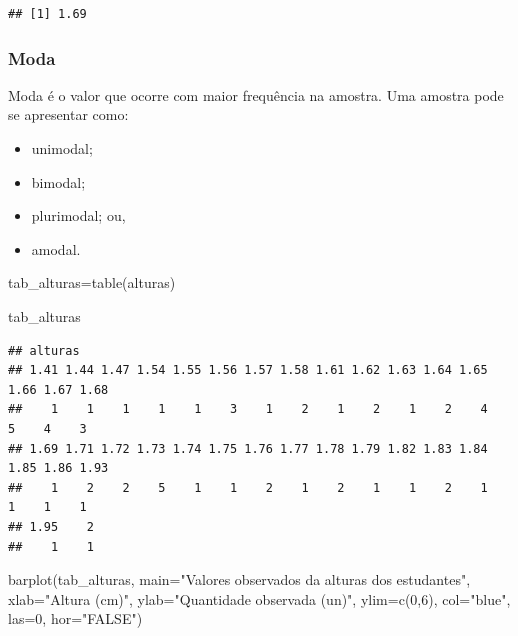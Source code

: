 \documentclass[
]{book}
\newenvironment{Shaded}{\begin{snugshade}}{\end{snugshade}}
\newcommand{\AttributeTok}[1]{\textcolor[rgb]{0.77,0.63,0.00}{#1}}
\newcommand{\DecValTok}[1]{\textcolor[rgb]{0.00,0.00,0.81}{#1}}
\newcommand{\FunctionTok}[1]{\textcolor[rgb]{0.00,0.00,0.00}{#1}}
\newcommand{\NormalTok}[1]{#1}
\newcommand{\OtherTok}[1]{\textcolor[rgb]{0.56,0.35,0.01}{#1}}
\newcommand{\StringTok}[1]{\textcolor[rgb]{0.31,0.60,0.02}{#1}}
\providecommand{\tightlist}{%
  \setlength{\itemsep}{0pt}\setlength{\parskip}{0pt}}
\begin{document}
\begin{verbatim}
## [1] 1.69
\end{verbatim}

\hypertarget{moda}{%
\subsubsection{Moda}\label{moda}}

\hfill\break

Moda é o valor que ocorre com maior frequência na amostra. Uma amostra pode se apresentar como:

\hfill\break

\begin{itemize}
\tightlist
\item
  unimodal;
\item
  bimodal;
\item
  plurimodal; ou,
\item
  amodal.
\end{itemize}

\hfill\break

\begin{Shaded}
\begin{Highlighting}[]
\NormalTok{tab\_alturas}\OtherTok{=}\FunctionTok{table}\NormalTok{(alturas)}

\NormalTok{tab\_alturas}
\end{Highlighting}
\end{Shaded}

\begin{verbatim}
## alturas
## 1.41 1.44 1.47 1.54 1.55 1.56 1.57 1.58 1.61 1.62 1.63 1.64 1.65 1.66 1.67 1.68 
##    1    1    1    1    1    3    1    2    1    2    1    2    4    5    4    3 
## 1.69 1.71 1.72 1.73 1.74 1.75 1.76 1.77 1.78 1.79 1.82 1.83 1.84 1.85 1.86 1.93 
##    1    2    2    5    1    1    2    1    2    1    1    2    1    1    1    1 
## 1.95    2 
##    1    1
\end{verbatim}

\begin{Shaded}
\begin{Highlighting}[]
\FunctionTok{barplot}\NormalTok{(tab\_alturas,}
        \AttributeTok{main=}\StringTok{"Valores observados da alturas dos estudantes"}\NormalTok{,}
        \AttributeTok{xlab=}\StringTok{"Altura (cm)"}\NormalTok{,}
        \AttributeTok{ylab=}\StringTok{"Quantidade observada (un)"}\NormalTok{,}
        \AttributeTok{ylim=}\FunctionTok{c}\NormalTok{(}\DecValTok{0}\NormalTok{,}\DecValTok{6}\NormalTok{),}
        \AttributeTok{col=}\StringTok{"blue"}\NormalTok{,}
        \AttributeTok{las=}\DecValTok{0}\NormalTok{, }
        \AttributeTok{hor=}\StringTok{"FALSE"}\NormalTok{)}
\end{Highlighting}
\end{Shaded}
\end{document}
